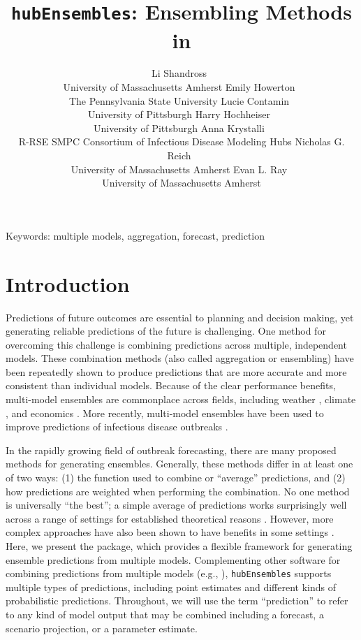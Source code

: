 \documentclass[
  article,
  shortnames,
  notitle]{jss}
\author{Li Shandross~\orcidlink{0009-0008-1348-1954}\\University of
Massachusetts Amherst \And Emily
Howerton~\orcidlink{0000-0002-0639-3728}\\The Pennsylvania State
University \AND Lucie
Contamin~\orcidlink{0000-0001-5797-1279}\\University of
Pittsburgh \And Harry
Hochheiser~\orcidlink{0000-0001-8793-9982}\\University of
Pittsburgh \AND Anna Krystalli~\orcidlink{0000-0002-2378-4915}\\R-RSE
SMPC \And Consortium of Infectious Disease Modeling Hubs \AND Nicholas
G. Reich~\orcidlink{0000-0003-3503-9899}\\University of Massachusetts
Amherst \And Evan L. Ray~\orcidlink{0000-0003-4035-0243}\\University of
Massachusetts Amherst}
\title{\texttt{hubEnsembles}: Ensembling Methods in \proglang{R}}
\begin{document}
\maketitle

Keywords: multiple models, aggregation, forecast, prediction

\section{Introduction}\label{sec-intro}

Predictions of future outcomes are essential to planning and decision
making, yet generating reliable predictions of the future is
challenging. One method for overcoming this challenge is combining
predictions across multiple, independent models. These combination
methods (also called aggregation or ensembling) have been repeatedly
shown to produce predictions that are more accurate
\citep{clemen1989, timmermann2006b} and more consistent
\citep{hibon2005} than individual models. Because of the clear
performance benefits, multi-model ensembles are commonplace across
fields, including weather \citep{alley2019}, climate
\citep{tebaldi2007}, and economics \citep{aastveit2018}. More recently,
multi-model ensembles have been used to improve predictions of
infectious disease outbreaks
\citep{viboud2018, johansson2019, mcgowan2019, reich_accuracy_2019, cramer2022}.

In the rapidly growing field of outbreak forecasting, there are many
proposed methods for generating ensembles. Generally, these methods
differ in at least one of two ways: (1) the function used to combine or
``average'' predictions, and (2) how predictions are weighted when
performing the combination. No one method is universally ``the best''; a
simple average of predictions works surprisingly well across a range of
settings \citep{mcgowan2019, paireau_ensemble_2022, ray_comparing_2023}
for established theoretical reasons \citep{winkler2015}. However, more
complex approaches have also been shown to have benefits in some
settings
\citep{yamana_superensemble_2016, ray_prediction_2018, reich_accuracy_2019, colon-gonzalez_probabilistic_2021}.
Here, we present the  package, which provides a
flexible framework for generating ensemble predictions from multiple
models. Complementing other software for combining predictions from
multiple models (e.g.,
\citep{pedregosa_scikit-learn_2011, weiss2019, bosse_stackr_2023, couch_stacks_2023}),
\texttt{hubEnsembles} supports multiple types of predictions, including
point estimates and different kinds of probabilistic predictions.
Throughout, we will use the term ``prediction'' to refer to any kind of
model output that may be combined including a forecast, a scenario
projection, or a parameter estimate.
\end{document}
